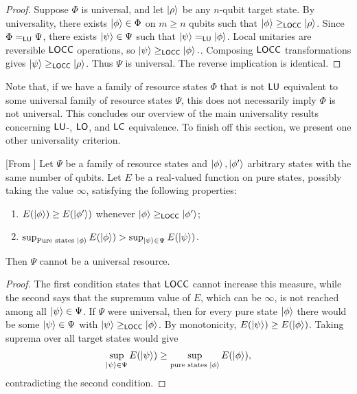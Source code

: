 \begin{proof}
Suppose $\Phi$ is universal, and let $\ket{\rho}$ be any $n$-qubit target state.
By universality, there exists $\ket{\phi}\in\Phi$ on $m\ge n$ qubits such that
$
    \ket{\phi}
    \geq_{\mathsf{LOCC}}
    \ket{\rho}
$.
Since $\Phi =_{\mathsf{LU}} \Psi$, there exists $\ket{\psi}\in\Psi$ such that
$\ket{\psi} =_{\mathsf{LU}}\ket{\phi}$. Local unitaries are reversible $\mathsf{LOCC}$
operations, so
$
    \ket{\psi}\geq_{\mathsf{LOCC}}\ket{\phi}.
$.
Composing $\mathsf{LOCC}$ transformations gives
$
    \ket{\psi}
    \geq_{\mathsf{LOCC}}
    \ket{\rho}
$.
Thus $\Psi$ is universal. The reverse implication is identical.
\end{proof}

Note that, if we have a family of resource states $\Phi$ that is not $\mathsf{LU}$ equivalent to some universal family of resource states $\Psi$, this does not necessarily imply $\Phi$ is not universal. This concludes our overview of the main universality results concerning $\mathsf{LU}$-, $\mathsf{LO}$, and $\mathsf{LC}$ equivalence. To finish off this section, we present one other universality criterion.

\begin{theorem}
\label{thm:measure-for-universal}
[From \cite{MBQC-measures}] Let $\Psi$ be a family of resource states and $\ket\phi, \ket{\phi'}$ arbitrary states with the same number of qubits. Let $E$ be a real-valued function on pure states, possibly taking the value $\infty$, satisfying the following properties:
\begin{enumerate}
    \item $E(\ket\phi) \geq E(\ket{\phi'})$ whenever $\ket\phi \geq_{\mathsf{LOCC}} \ket{\phi'}$;
    \item $\sup_{\text{Pure states }\ket\phi} E(\ket\phi) > \sup_{\ket\psi \in \Psi} E(\ket\psi)$. 
\end{enumerate}
Then $\Psi$ cannot be a universal resource.
\end{theorem}

\begin{proof}
The first condition states that $\mathsf{LOCC}$ cannot increase this measure, while the second says that the supremum value of $E$, which can be $\infty$, is not reached among all $\ket\psi \in \Psi$. If $\Psi$ were universal, then for every pure state $\ket\phi$ there would be
some $\ket\psi\in\Psi$ with $\ket\psi\geq_{\mathsf{LOCC}}\ket\phi$. By monotonicity,
$E(\ket\psi)\geq E(\ket\phi)$. Taking suprema over all target states would give
\begin{align}
    \sup_{\ket\psi\in\Psi}E(\ket\psi)
    \ge
    \sup_{\text{pure states }\ket\phi}E(\ket\phi),
\end{align}
contradicting the second condition.
\end{proof}

